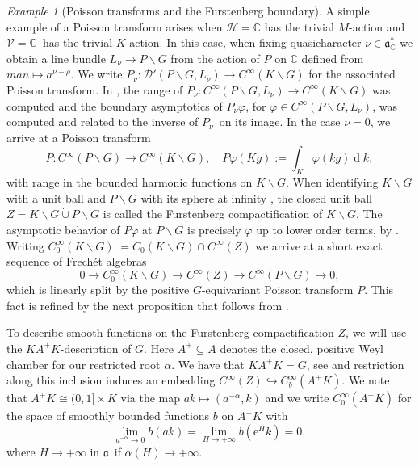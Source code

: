 \documentclass[a4paper,reqno]{amsart}
\numberwithin{equation}{section}
\def\rd{\operatorname{d}\!}
\def\C{\mathbb{C}}
\theoremstyle{definition}
\theoremstyle{remark}
\newtheorem{example}[thm]{Example}
\begin{document}
\begin{example}[Poisson transforms and the Furstenberg boundary]
A simple example of a Poisson transform arises when $\mathcal{H}=\C$ has the trivial $M$-action and $\mathcal{V}=\C$ has the trivial $K$-action. In this case, when fixing quasicharacter $\nu\in \mathfrak{a}_\C^*$ we obtain a line bundle $L_\nu\to P\backslash G$ from the action of $P$ on $\C$ defined from $man\mapsto a^{\nu+\rho}$. We write $P_\nu:\mathcal{D}'(P\backslash G,L_\nu)\to C^\infty(K\backslash G)$ for the associated Poisson transform. In \cite{vcbschlich}, the range of  $P_\nu:C^\infty(P\backslash G,L_\nu)\to C^\infty(K\backslash G)$ was computed and the boundary asymptotics of $P_\nu\varphi$, for $\varphi\in C^\infty(P\backslash G,L_\nu)$, was computed and related to the inverse of $P_\nu$ on its image. In the case $\nu=0$, we arrive at a Poisson transform
$$P:C^\infty(P\backslash G)\to C^\infty(K\backslash G), \quad P\varphi(Kg):=\int_K \varphi(kg)\rd k,$$
with range in the bounded harmonic functions on $K\backslash G$. When identifying $K\backslash G$ with a unit ball and $P\backslash G$ with its sphere at infinity \cite{jiborel}, the closed unit ball $Z=K\backslash G\dot{\cup}P\backslash G$ is called the Furstenberg compactification \cite{furstann} of $K\backslash G$. The asymptotic behavior of $P\varphi$ at $P\backslash G$ is precisely $\varphi$ up to lower order terms, by \cite{vcbschlich}. Writing $C_0^\infty(K\backslash G):=C_0(K\backslash G)\cap C^\infty(Z)$ we arrive at a short exact sequence of Frech\'{e}t algebras
$$0\to C_0^\infty(K\backslash G)\to C^\infty(Z)\to C^\infty(P\backslash G)\to 0,$$
which is linearly split by the positive $G$-equivariant Poisson transform $P$. This fact is refined by the next proposition that follows from \cite{vcbschlich}.
\end{example}


To describe smooth functions on the Furstenberg compactification $Z$,  we will use the $KA^+K$-description of $G$. Here $A^+\subseteq A$ denotes the closed, positive Weyl chamber for our restricted root $\alpha$. We have that $KA^+K= G$, see \cite[Theorem 8.6, page 323]{HelgasonDGLGSS} and restriction along this inclusion induces an embedding $C^\infty(Z)\hookrightarrow C^\infty_b(A^+K)$. We note that $A^+K\cong (0,1]\times K$ via the map $ak\mapsto (a^{-\alpha},k)$ and we write $C^\infty_0(A^+K)$ for the space of smoothly bounded functions $b$ on $A^+K$ with 
$$\lim_{a^{-\alpha}\to 0} b(ak)=\lim_{H\to +\infty} b(\mathrm{e}^Hk)=0,$$
where $H\to +\infty$ in $\mathfrak{a}$ if $\alpha(H)\to +\infty$.
\end{document}
